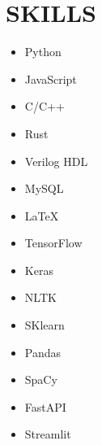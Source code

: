 \documentclass[11pt,letter,sans]{moderncv} %
\begin{document}
\section{SKILLS}
    \begin{cvcolumns}
        {
            \vspace{-0.5em}
                \begin{itemize}
                    \item Python
                    \item JavaScript
                    \item C/C++
                    \item Rust
                    \item Verilog HDL
                    \item MySQL
                    \item \LaTeX
                \end{itemize}
        }
        {
            \vspace{-.5em}
                \begin{itemize}
                        \item TensorFlow
                        \item Keras
                        \item NLTK
                        \item SKlearn
                        \item Pandas
                        \item SpaCy
                        \item FastAPI
                        \item Streamlit
                \end{itemize}
        }
        

\end{cvcolumns}
\end{document}
